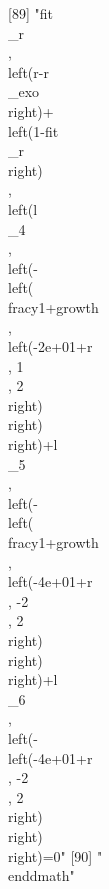  [89] "{{fit\\_r}}\\, \\left({r}-{{r\\_exo}}\\right)+\\left(1-{{fit\\_r}}\\right)\\, \\left({{l\\_4}}\\, \\left(-\\left(\\frac{{y}}{1+{growth}}\\, \\left(-2e+01+{r}\\, 1\\, 2\\right)\\right)\\right)+{{l\\_5}}\\, \\left(-\\left(\\frac{{y}}{1+{growth}}\\, \\left(-4e+01+{r}\\, -2\\, 2\\right)\\right)\\right)+{{l\\_6}}\\, \\left(-\\left(-4e+01+{r}\\, -2\\, 2\\right)\\right)\\right)=0"                                                                                                     
 [90] "\\end{dmath}"                                                                                                                                                                                                                                                                                                                                                                                                                                                                                
